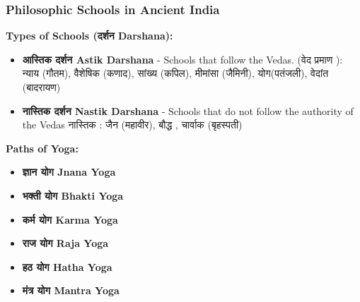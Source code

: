 \begin{frame}[fragile]\frametitle{Philosophic Schools in Ancient India}
    \textbf{Types of Schools (दर्शन  Darshana):}
    \begin{itemize}
        \item \textbf{आस्तिक  दर्शन Astik Darshana} - Schools that follow the Vedas. (वेद प्रमाण ): न्याय (गौतम), वैशेषिक (कणाद), सांख्य (कपिल), मीमांसा (जैमिनी), योग(पतंजली), वेदांत (बादरायण)
        \item \textbf{नास्तिक  दर्शन  Nastik Darshana} - Schools that do not follow the authority of the Vedas नास्तिक : जैन (महावीर), बौद्ध , चार्वाक (बृहस्पती)
    \end{itemize}
	
    \textbf{Paths of Yoga:}
    \begin{itemize}
        \item \textbf{ ज्ञान योग Jnana Yoga}
        \item \textbf{भक्ती योग  Bhakti Yoga}
        \item \textbf{कर्म योग Karma Yoga}
        \item \textbf{राज योग Raja Yoga}
        \item \textbf{हठ योग Hatha Yoga}
        \item \textbf{मंत्र योग Mantra Yoga}
    \end{itemize}	
\end{frame}



